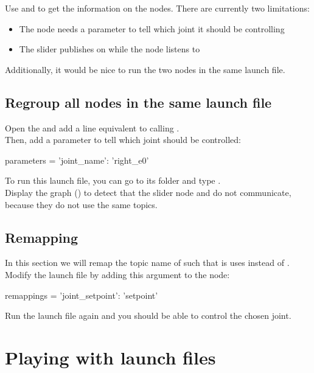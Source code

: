\documentclass{ecnreport}
\begin{document}
Use  and  to get the information on the nodes. There are currently two limitations:
\begin{itemize}
 \item The  node needs a parameter to tell which joint it should be controlling
 \item The slider publishes on  while the   node listens to 
\end{itemize}
Additionally, it would be nice to run the two nodes in the same launch file.

\subsection{Regroup all nodes in the same launch file}

Open the  and add a line equivalent to calling .\\
Then, add a parameter to tell which joint should be controlled:
\begin{pythoncode}
 parameters = {'joint_name': 'right_e0'}
\end{pythoncode}


To run this launch file, you can go to its folder and type .\\
Display the graph () to detect that the slider node and  do not communicate, because they do not use the same topics.

\subsection{Remapping}

In this section we will remap the topic name of  such that is uses  instead of .\\

Modify the launch file by adding this argument to the  node:

\begin{pythoncodelarge}
remappings = {'joint_setpoint': 'setpoint'}
\end{pythoncodelarge}
Run the launch file again and you should be able to control the chosen joint.

\section{Playing with launch files}
\end{document}
